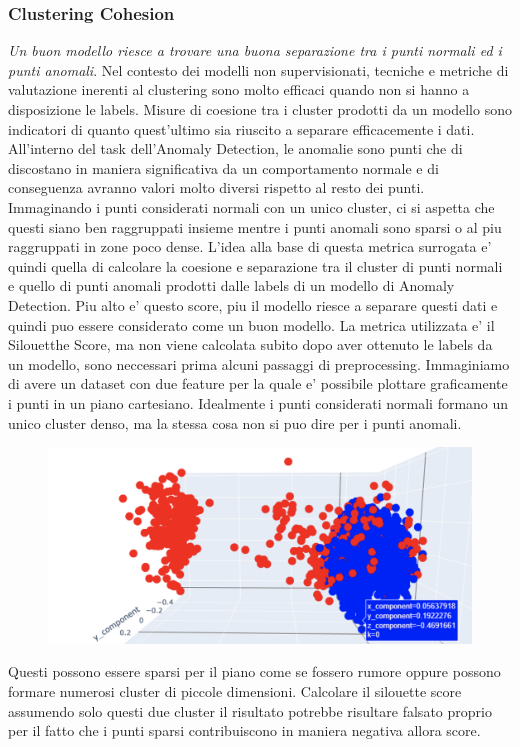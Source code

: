 \subsubsection{Clustering Cohesion}
\textit{Un buon modello riesce a trovare una buona separazione tra i punti normali ed i punti anomali}.
Nel contesto dei modelli non supervisionati, tecniche e metriche di valutazione inerenti al clustering sono molto efficaci quando non si hanno a disposizione le labels. Misure di coesione tra i cluster prodotti da un modello sono indicatori di quanto quest'ultimo sia riuscito a separare efficacemente i dati.
All'interno del task dell'Anomaly Detection, le anomalie sono punti che di discostano in maniera significativa da un comportamento normale e di conseguenza avranno valori molto diversi rispetto al resto dei punti. Immaginando i punti considerati normali con un unico cluster, ci si aspetta che questi siano ben raggruppati insieme mentre i punti anomali sono sparsi o al piu raggruppati in zone poco dense. 
L'idea alla base di questa metrica surrogata e' quindi quella di calcolare la coesione e separazione tra il cluster di punti normali e quello di punti anomali prodotti dalle labels di un modello di Anomaly Detection. Piu alto e' questo score, piu il modello riesce a separare questi dati e quindi puo essere considerato come un buon modello.
La metrica utilizzata e' il Silouetthe Score, ma non viene calcolata subito dopo aver ottenuto le labels da un modello, sono neccessari prima alcuni passaggi di preprocessing.
Immaginiamo di avere un dataset con due feature per la quale e' possibile plottare graficamente i punti in un piano cartesiano. Idealmente i punti considerati normali formano un unico cluster denso, ma la stessa cosa non si puo dire per i punti anomali.
\begin{figure}[t]
\includegraphics[width=14cm, scale=1]{images/plot-anomalies-normal}
\centering
\end{figure}
Questi possono essere sparsi per il piano come se fossero rumore oppure possono formare numerosi cluster di piccole dimensioni. Calcolare il silouette score assumendo solo questi due cluster il risultato potrebbe risultare falsato proprio per il fatto che i punti sparsi contribuiscono in maniera negativa allora score.

